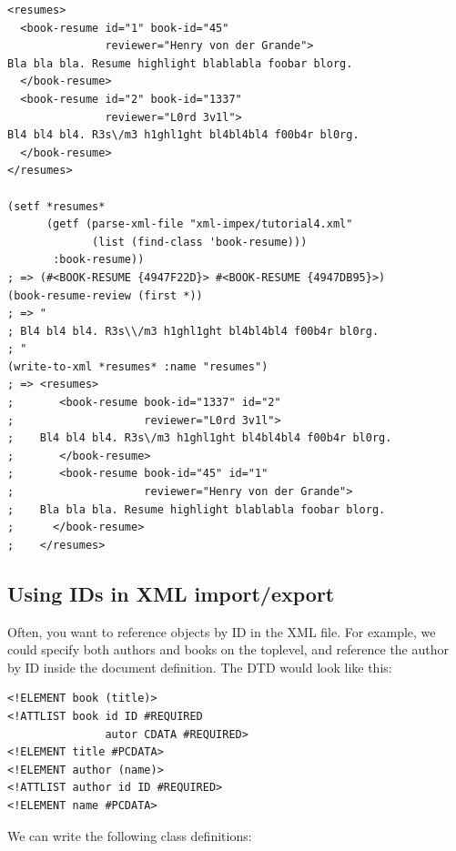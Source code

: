 \begin{Verbatim}[fontsize=\small,frame=leftline,framerule=0.9mm,rulecolor=\color{gray},framesep=5.1mm,xleftmargin=5mm,fontfamily=cmtt]
<resumes>
  <book-resume id="1" book-id="45"
               reviewer="Henry von der Grande">
Bla bla bla. Resume highlight blablabla foobar blorg.
  </book-resume>
  <book-resume id="2" book-id="1337"
               reviewer="L0rd 3v1l">
Bl4 bl4 bl4. R3s\/m3 h1ghl1ght bl4bl4bl4 f00b4r bl0rg.
  </book-resume>
</resumes>

(setf *resumes*
      (getf (parse-xml-file "xml-impex/tutorial4.xml"
             (list (find-class 'book-resume)))
       :book-resume))
; => (#<BOOK-RESUME {4947F22D}> #<BOOK-RESUME {4947DB95}>)
(book-resume-review (first *))
; => "
; Bl4 bl4 bl4. R3s\\/m3 h1ghl1ght bl4bl4bl4 f00b4r bl0rg.
; "
(write-to-xml *resumes* :name "resumes")
; => <resumes>
;       <book-resume book-id="1337" id="2"
;                    reviewer="L0rd 3v1l">
;    Bl4 bl4 bl4. R3s\/m3 h1ghl1ght bl4bl4bl4 f00b4r bl0rg.
;       </book-resume>
;       <book-resume book-id="45" id="1"
;                    reviewer="Henry von der Grande">
;    Bla bla bla. Resume highlight blablabla foobar blorg.
;      </book-resume>
;    </resumes>
\end{Verbatim}


\subsection{ Using IDs in XML import/export}

Often, you want to reference objects by ID in the XML file. For
example, we could specify both authors and books on the toplevel,
and reference the author by ID inside the document definition. The
DTD would look like this:

\begin{Verbatim}[fontsize=\small,frame=leftline,framerule=0.9mm,rulecolor=\color{gray},framesep=5.1mm,xleftmargin=5mm,fontfamily=cmtt]
<!ELEMENT book (title)>
<!ATTLIST book id ID #REQUIRED
               autor CDATA #REQUIRED>
<!ELEMENT title #PCDATA>
<!ELEMENT author (name)>
<!ATTLIST author id ID #REQUIRED>
<!ELEMENT name #PCDATA>
\end{Verbatim}
We can write the following class definitions:

